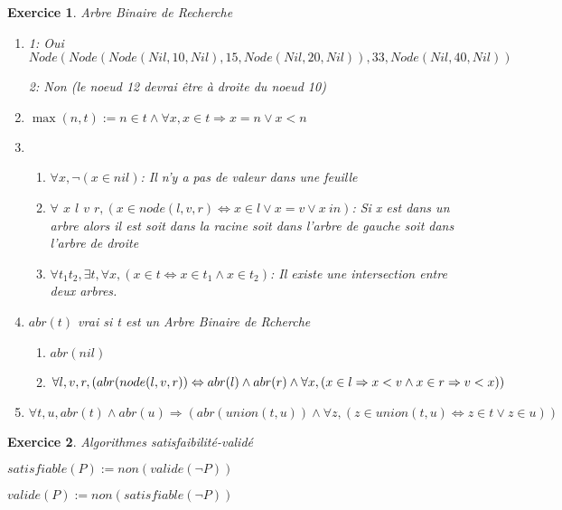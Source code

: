 \documentclass{article}
\theoremstyle{plain}
\newtheorem{exo}{Exercice}%
\begin{document}
\begin{exo} Arbre Binaire de Recherche 
    \begin{enumerate}
        \item   1: Oui $Node(Node(Node(Nil, 10, Nil), 15, Node(Nil, 20, Nil)), 33, Node(Nil, 40, Nil))$

                2: Non (le noeud 12 devrai être à droite du noeud 10)

        \item   $\max(n, t) := n \in t \wedge \forall x, x \in t \Rightarrow x = n \vee x < n$
        
        \item \begin{enumerate}
            \item $\forall x, \neg(x \in nil)$: Il n'y a pas de valeur dans une feuille
            \item $\forall$ $x$ $l$ $v$ $r, (x \in node(l, v, r) \Leftrightarrow  x \in l \vee x = v \vee x \ in)$:
                    Si x est dans un arbre alors il est soit dans la racine soit 
                    dans l'arbre de gauche soit dans l'arbre de droite
            \item $\forall t_1 t_2, \exists t, \forall x, (x \in t \Leftrightarrow x \in t_1 \wedge x \in t_2)$:
                    Il existe une intersection entre deux arbres.
        \end{enumerate}

        \item $abr(t)$ vrai si t est un Arbre Binaire de Rcherche

            \begin{enumerate}
                \item $abr(nil)$
                \item $\forall l, v, r, (abr(node(l, v, r)) \Leftrightarrow abr(l) \wedge abr(r) \\
                \wedge \forall x, (x \in l \Rightarrow x < v \wedge x \in r \Rightarrow v < x))$ 
            \end{enumerate}

        \item $\forall t,u, abr(t) \wedge abr(u) \Rightarrow (abr(union(t, u))
                \wedge \forall z, (z \in union(t, u) \Leftrightarrow z \in t \vee z \in u))$
    \end{enumerate}
\end{exo}

\begin{exo} Algorithmes satisfaibilité-validé

    $satisfiable(P) := non(valide(\neg P))$

    $valide(P) := non(satisfiable(\neg P))$
\end{exo}
\end{document}
